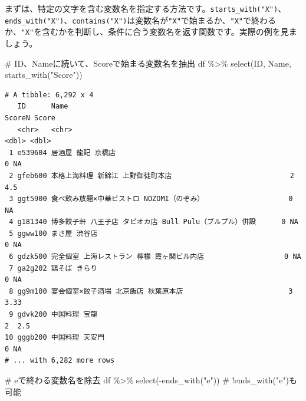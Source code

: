 \documentclass[
  a4paper,
  pandoc,
  ja=standard,
  jafont=haranoaji]{bxjsbook}
\newenvironment{Shaded}{\begin{snugshade}}{\end{snugshade}}
\newcommand{\CommentTok}[1]{\textcolor[rgb]{0.37,0.37,0.37}{#1}}
\newcommand{\FunctionTok}[1]{\textcolor[rgb]{0.28,0.35,0.67}{#1}}
\newcommand{\NormalTok}[1]{\textcolor[rgb]{0.00,0.48,0.65}{#1}}
\newcommand{\SpecialCharTok}[1]{\textcolor[rgb]{0.37,0.37,0.37}{#1}}
\newcommand{\StringTok}[1]{\textcolor[rgb]{0.13,0.47,0.30}{#1}}
\begin{document}
まずは、特定の文字を含む変数名を指定する方法です。\texttt{starts\_with("X")}、\texttt{ends\_with("X")}、\texttt{contains("X")}は変数名が\texttt{"X"}で始まるか、\texttt{"X"}で終わるか、\texttt{"X"}を含むかを判断し、条件に合う変数名を返す関数です。実際の例を見ましょう。

\begin{Shaded}
\begin{Highlighting}[numbers=left,,]
\CommentTok{\# ID、Nameに続いて、Scoreで始まる変数名を抽出}
\NormalTok{df }\SpecialCharTok{\%\textgreater{}\%}
  \FunctionTok{select}\NormalTok{(ID, Name, }\FunctionTok{starts\_with}\NormalTok{(}\StringTok{"Score"}\NormalTok{))}
\end{Highlighting}
\end{Shaded}

\begin{verbatim}
# A tibble: 6,292 x 4
   ID      Name                                                     ScoreN Score
   <chr>   <chr>                                                     <dbl> <dbl>
 1 e539604 居酒屋 龍記 京橋店                                            0 NA   
 2 gfeb600 本格上海料理 新錦江 上野御徒町本店                            2  4.5 
 3 ggt5900 食べ飲み放題×中華ビストロ NOZOMI（のぞみ）                    0 NA   
 4 g181340 博多餃子軒 八王子店 タピオカ店 Bull Pulu（ブルプル）併設      0 NA   
 5 ggww100 まさ屋 渋谷店                                                 0 NA   
 6 gdzk500 完全個室 上海レストラン 檸檬 霞ヶ関ビル内店                   0 NA   
 7 ga2g202 鶏そば きらり                                                 0 NA   
 8 gg9m100 宴会個室×餃子酒場 北京飯店 秋葉原本店                         3  3.33
 9 gdvk200 中国料理 宝龍                                                 2  2.5 
10 gggb200 中国料理 天安門                                               0 NA   
# ... with 6,282 more rows
\end{verbatim}

\begin{Shaded}
\begin{Highlighting}[numbers=left,,]
\CommentTok{\# eで終わる変数名を除去}
\NormalTok{df }\SpecialCharTok{\%\textgreater{}\%}
  \FunctionTok{select}\NormalTok{(}\SpecialCharTok{{-}}\FunctionTok{ends\_with}\NormalTok{(}\StringTok{"e"}\NormalTok{)) }\CommentTok{\# !ends\_with("e")も可能}
\end{Highlighting}
\end{Shaded}
\end{document}
